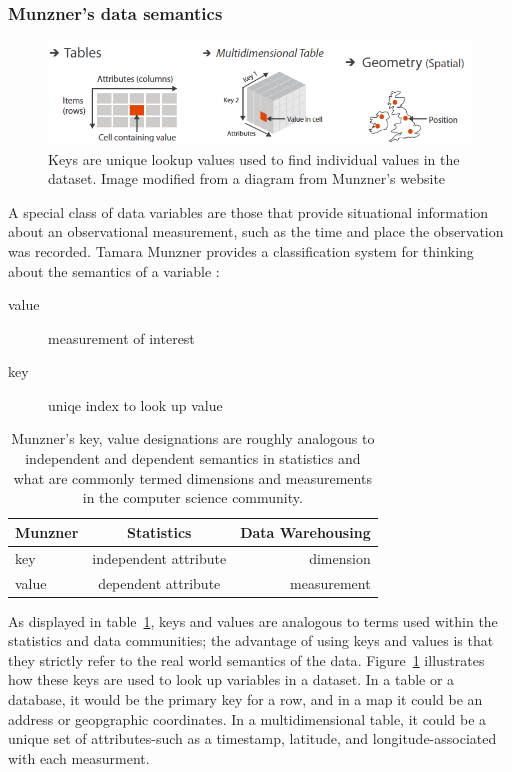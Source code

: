 \documentclass[letterpaper,onecolumn,titlepage]{Ythesis}
\begin{document}
\subsubsection{Munzner's data semantics}

\begin{figure}
 \includegraphics[width=\textwidth]{intro/munzner_datatypes}
\caption{Keys are unique lookup values used to find individual values in the dataset. Image modified from a diagram from Munzner's website \cite{_visualization_????}}
\label{fig:munzner_datatypes}
\end{figure}


A special class of data variables are those that provide situational information about an observational measurement, such as the time and place the observation was recorded. Tamara Munzner provides a classification system for thinking about the semantics of a variable \cite{munzner_what_2014}:
\begin{description}
\item[value] measurement of interest 
\item[key] uniqe index to look up value
\end{description}

\begin{table}
\begin{center}
\begin{tabular}{ l c r }
  Munzner & Statistics & Data Warehousing \\
  \hline
  key & independent attribute & dimension \\
  value & dependent attribute & measurement\\
\end{tabular}
\caption{Munzner's key, value designations are roughly analogous to independent and dependent semantics in statistics and what are commonly termed dimensions and measurements in the computer science community.}
\label{table:munzner_semantics}
\end{center}
\end{table}

As displayed in table~\ref{table:munzner_semantics}, keys and values are analogous to terms used within the statistics and data communities; the advantage of using keys and values is that they strictly refer to the real world semantics of the data\cite{munzner_what_2014}. Figure~\ref{fig:munzner_datatypes} illustrates how these keys are used to look up variables in a dataset. In a table or a database, it would be the primary key for a row, and in a map it could be an address or geopgraphic coordinates. In a multidimensional table, it could be a unique set of attributes-such as a timestamp, latitude, and longitude-associated with each measurment. 
\end{document}
